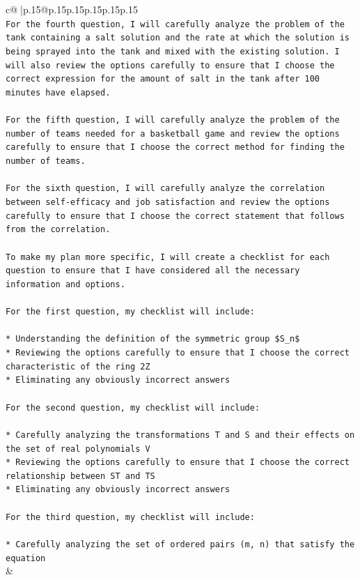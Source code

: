 \documentclass{article}
\begin{document}
{\begin{supertabular}{c@{$\;$}|p{.15\linewidth}@{}p{.15\linewidth}p{.15\linewidth}p{.15\linewidth}p{.15\linewidth}p{.15\linewidth}}
{{{\\ 
\texttt{For the fourth question, I will carefully analyze the problem of the tank containing a salt solution and the rate at which the solution is being sprayed into the tank and mixed with the existing solution. I will also review the options carefully to ensure that I choose the correct expression for the amount of salt in the tank after 100 minutes have elapsed.} \\
\\ 
\texttt{For the fifth question, I will carefully analyze the problem of the number of teams needed for a basketball game and review the options carefully to ensure that I choose the correct method for finding the number of teams.} \\
\\ 
\texttt{For the sixth question, I will carefully analyze the correlation between self{-}efficacy and job satisfaction and review the options carefully to ensure that I choose the correct statement that follows from the correlation.} \\
\\ 
\texttt{To make my plan more specific, I will create a checklist for each question to ensure that I have considered all the necessary information and options.} \\
\\ 
\texttt{For the first question, my checklist will include:} \\
\\ 
\texttt{* Understanding the definition of the symmetric group \$S\_n\$} \\
\texttt{* Reviewing the options carefully to ensure that I choose the correct characteristic of the ring 2Z} \\
\texttt{* Eliminating any obviously incorrect answers} \\
\\ 
\texttt{For the second question, my checklist will include:} \\
\\ 
\texttt{* Carefully analyzing the transformations T and S and their effects on the set of real polynomials V} \\
\texttt{* Reviewing the options carefully to ensure that I choose the correct relationship between ST and TS} \\
\texttt{* Eliminating any obviously incorrect answers} \\
\\ 
\texttt{For the third question, my checklist will include:} \\
\\ 
\texttt{* Carefully analyzing the set of ordered pairs (m, n) that satisfy the equation} \\
            }
        }
    }
    & \\ \\

\end{supertabular}
}
\end{document}
